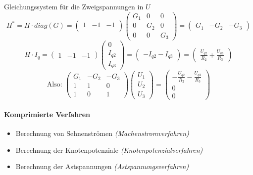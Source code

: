 \documentclass[german]{article}
\begin{document}
	Gleichungssystem für die Zweigspannungen in $U$
	\[
		H^* = H \cdot diag(G) =
			\begin{pmatrix}
				1 & -1 & -1 \\
			\end{pmatrix}
			\begin{pmatrix}
				G_1 & 0 & 0 \\
				0 & G_2 & 0 \\
				0 & 0 & G_3
			\end{pmatrix}
			=
			\begin{pmatrix}
				G_1 & -G_2 & -G_3
			\end{pmatrix}
	\]
	\[
		H \cdot I_q =
			\begin{pmatrix}
				1 & -1 & -1
			\end{pmatrix}
			\begin{pmatrix}
				0 \\
				I_{q2} \\
				I_{q3}
			\end{pmatrix}
			=
			\begin{pmatrix}
				- I_{q2} - I_{q3}
			\end{pmatrix}
			=
			\begin{pmatrix}
				\frac{U_{q2}}{R_2} + \frac{U_{q3}}{R_3}
			\end{pmatrix}
	\]
	\[
		\text{Also: }
		\begin{pmatrix}
			G_1 & -G_2 & -G_3 \\
			1 & 1 & 0 \\
			1 & 0 & 1
		\end{pmatrix}
		\begin{pmatrix}
			U_1 \\
			U_2 \\
			U_3
		\end{pmatrix}
		=
		\begin{pmatrix}
			- \frac{U_{q2}}{R_2} - \frac{U_{q3}}{R_3} \\
			0 \\
			0
		\end{pmatrix}
	\]

\paragraph{Komprimierte Verfahren}
	\begin{itemize}
		\item Berechnung von Sehnenströmen {\it (Machenstromverfahren)}
		\item Berechnung der Knotenpotenziale {\it (Knotenpotenzialverfahren)}
		\item Berechnung der Astspannungen {\it (Astspannungsverfahren)}
	\end{itemize}
\end{document}
